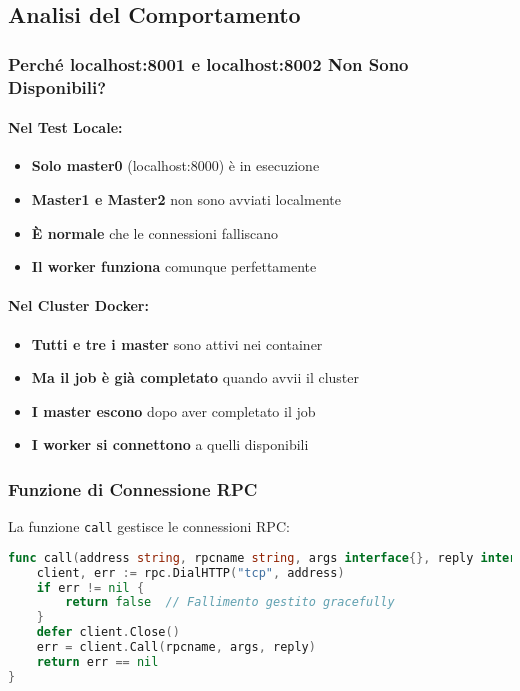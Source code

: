 \documentclass[12pt,a4paper]{article}
\begin{document}
\subsection{Analisi del Comportamento}

\subsubsection{Perché localhost:8001 e localhost:8002 Non Sono Disponibili?}

\paragraph{Nel Test Locale:}
\begin{itemize}
\item \textbf{Solo master0} (localhost:8000) è in esecuzione
\item \textbf{Master1 e Master2} non sono avviati localmente
\item \textbf{È normale} che le connessioni falliscano
\item \textbf{Il worker funziona} comunque perfettamente
\end{itemize}

\paragraph{Nel Cluster Docker:}
\begin{itemize}
\item \textbf{Tutti e tre i master} sono attivi nei container
\item \textbf{Ma il job è già completato} quando avvii il cluster
\item \textbf{I master escono} dopo aver completato il job
\item \textbf{I worker si connettono} a quelli disponibili
\end{itemize}

\subsubsection{Funzione di Connessione RPC}

La funzione \texttt{call} gestisce le connessioni RPC:

\begin{lstlisting}[language=go]
func call(address string, rpcname string, args interface{}, reply interface{}) bool {
    client, err := rpc.DialHTTP("tcp", address)
    if err != nil {
        return false  // Fallimento gestito gracefully
    }
    defer client.Close()
    err = client.Call(rpcname, args, reply)
    return err == nil
}
\end{lstlisting}
\end{document}
